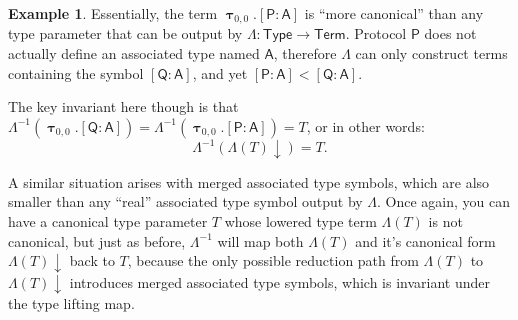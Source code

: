 \documentclass[headsepline,bibliography=totoc]{scrreport}
\newcommand{\namesym}[1]{\mathsf{#1}}
\newcommand{\proto}[1]{\bm{\mathsf{#1}}}
\newcommand{\genericsym}[2]{\bm{\uptau}_{#1,#2}}
\newcommand{\assocsym}[2]{[\proto{#1}\colon\namesym{#2}]}
\theoremstyle{definition}
\newtheorem{example}{Example}[chapter]
\theoremstyle{definition}
\theoremstyle{definition}
\begin{document}
\begin{example}
Essentially, the term $\genericsym{0}{0}.\assocsym{P}{A}$ is ``more canonical'' than any type parameter that can be output by $\Lambda:\namesym{Type}\rightarrow\namesym{Term}$. Protocol $\proto{P}$ does not actually define an associated type named $\namesym{A}$, therefore $\Lambda$ can only construct terms containing the symbol $\assocsym{Q}{A}$, and yet $\assocsym{P}{A}<\assocsym{Q}{A}$.

The key invariant here though is that $\Lambda^{-1}(\genericsym{0}{0}.\assocsym{Q}{A})=\Lambda^{-1}(\genericsym{0}{0}.\assocsym{P}{A})=T$, or in other words:
\[\Lambda^{-1}(\Lambda(T){\downarrow})=T.\]

A similar situation arises with merged associated type symbols, which are also smaller than any ``real'' associated type symbol output by $\Lambda$. Once again, you can have a canonical type parameter $T$ whose lowered type term $\Lambda(T)$ is not canonical, but just as before, $\Lambda^{-1}$ will map both $\Lambda(T)$ and it's canonical form $\Lambda(T){\downarrow}$ back to $T$, because the only possible reduction path from $\Lambda(T)$ to $\Lambda(T){\downarrow}$ introduces merged associated type symbols, which is invariant under the type lifting map.
\end{example}
\end{document}
